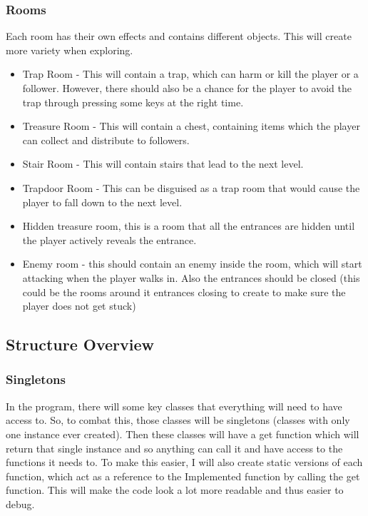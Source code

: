 \documentclass{article}
\begin{document}
            \subsubsection{Rooms}
                Each room has their own effects and contains different objects. This will create more variety when exploring.
                \begin{itemize}
                    \item Trap Room - This will contain a trap, which can harm or kill the player or a follower. However, there should also be a chance for the player to avoid the trap through pressing some keys at the right time.
                    \item Treasure Room - This will contain a chest, containing items which the player can collect and distribute to followers.
                    \item Stair Room - This will contain stairs that lead to the next level.
                    \item Trapdoor Room - This can be disguised as a trap room that would cause the player to fall down to the next level.
                    \item Hidden treasure room, this is a room that all the entrances are hidden until the player actively reveals the entrance.
                    \item Enemy room - this should contain an enemy inside the room, which will start attacking when the player walks in. Also the entrances should be closed (this could be the rooms around it entrances closing to create to make sure the player does not get stuck)
                \end{itemize}
        \subsection{Structure Overview}
            \subsubsection{Singletons}
                In the program, there will some key classes that everything will need to have access to. So, to combat this, those classes will be singletons (classes with only one instance ever created). Then these classes will have a get function which will return that single instance and so anything can call it and have access to the functions it needs to. To make this easier, I will also create static versions of each function, which act as a reference to the Implemented function by calling the get function. This will make the code look a lot more readable and thus easier to debug.
\end{document}
